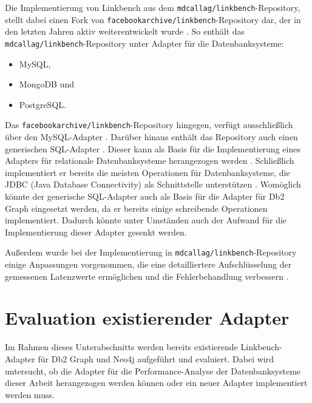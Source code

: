 Die Implementierung von Linkbench aus dem \texttt{mdcallag/linkbench}-Repository, stellt dabei einen Fork von \texttt{facebookarchive\allowbreak /linkbench}-Repository dar, der in den letzten Jahren aktiv weiterentwickelt wurde \cite{mc_linkbench_github}. So enthält das \texttt{mdcallag/linkbench}-Repository unter \cite{mc_linkbench_github} Adapter für die Datenbanksysteme: 
\begin{itemize}
    \item MySQL,
    \item MongoDB und
    \item PostgreSQL.
\end{itemize}
Das \texttt{facebookarchive/\allowbreak linkbench}-Repository hingegen, verfügt ausschließlich über den MySQL-Adapter \cite{mc_linkbench_github}. Darüber hinaus enthält das Repository auch einen generischen SQL-Adapter \cite{mc_linkbench_github}. Dieser kann als Basis für die Implementierung eines Adapters für relationale Datenbanksysteme herangezogen werden \cite{mc_linkbench_github}. Schließlich implementiert er bereits die meisten Operationen für Datenbanksysteme, die JDBC (Java Database Connectivity) als Schnittstelle unterstützen \cite{mc_linkbench_github}. Womöglich könnte der generische SQL-Adapter auch als Basis für die Adapter für Db2 Graph eingesetzt werden, da er bereits einige schreibende Operationen implementiert. Dadurch könnte unter Umständen auch der Aufwand für die Implementierung dieser Adapter gesenkt werden.

Außerdem wurde bei der Implementierung in \texttt{mdcallag/linkbench}-Repository einige Anpassungen vorgenommen, die eine detailliertere Aufschlüsselung der gemessenen Latenzwerte ermöglichen und die Fehlerbehandlung verbessern \cite{mc_linkbench_github}.

\section{Evaluation existierender Adapter}
\label{implementierung:evaluation}
Im Rahmen dieses Unterabschnitts werden bereits existierende Linkbench-Adapter für Db2 Graph und Neo4j aufgeführt und evaluiert. Dabei wird untersucht, ob die Adapter für die Performance-Analyse der Datenbanksysteme dieser Arbeit herangezogen werden können oder ein neuer Adapter implementiert werden muss. 

